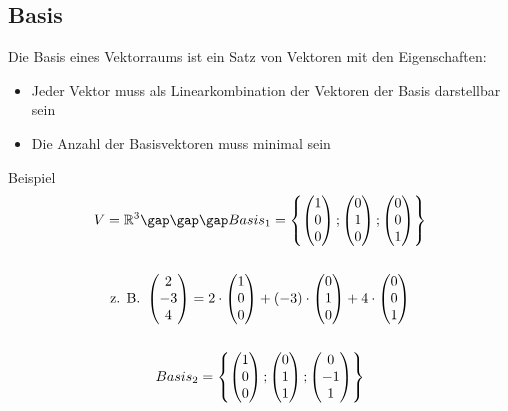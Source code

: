 \subsection{Basis}
Die Basis eines Vektorraums ist ein Satz von Vektoren mit den Eigenschaften:
\begin{itemize}
  \item Jeder Vektor muss als Linearkombination der Vektoren der Basis darstellbar sein
  \item Die Anzahl der Basisvektoren muss minimal sein
\end{itemize}
Beispiel
\begin{gather*}
  V = \mathbb{R}^3 \gap\gap\gap Basis_1 = \left\{\begin{pmatrix}1 \\ 0 \\ 0\end{pmatrix}; \begin{pmatrix}0 \\ 1 \\ 0\end{pmatrix}; \begin{pmatrix}0 \\ 0 \\ 1\end{pmatrix}\right\} \\\\
  \text{z. B. } \begin{pmatrix}2 \\ -3 \\ 4\end{pmatrix} = 2 \cdot \begin{pmatrix}1 \\ 0 \\ 0\end{pmatrix} + (-3) \cdot \begin{pmatrix}0 \\ 1 \\ 0\end{pmatrix} + 4 \cdot \begin{pmatrix}0 \\ 0 \\ 1\end{pmatrix} \\\\
  Basis_2 = \left\{\begin{pmatrix}1 \\ 0 \\ 0\end{pmatrix}; \begin{pmatrix}0 \\ 1 \\ 1\end{pmatrix}; \begin{pmatrix}0 \\ -1 \\ 1\end{pmatrix}\right\} \\\\

\end{gather*}
